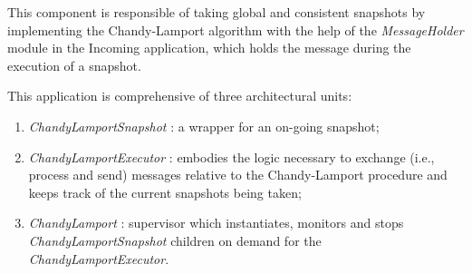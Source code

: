 This component is responsible of taking global and consistent snapshots by
implementing the Chandy-Lamport algorithm with the help of the
\textit{MessageHolder} module in the Incoming application, which holds the message
during the execution of a snapshot.

This application is comprehensive of three architectural units:

\begin{enumerate}
  \item \textit{ChandyLamportSnapshot} : a wrapper for an on-going
        snapshot;
  \item \textit{ChandyLamportExecutor} : embodies the logic necessary to
        exchange (i.e., process and send) messages relative to the
        Chandy-Lamport procedure and keeps track of the current snapshots being
        taken;
  \item \textit{ChandyLamport} : supervisor which instantiates, monitors and
        stops \textit{ChandyLamportSnapshot} children on demand for the
        \textit{ChandyLamportExecutor}.
\end{enumerate}

